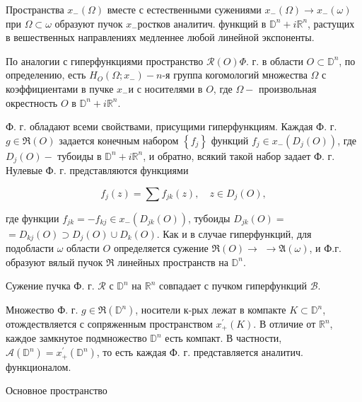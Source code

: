 \documentclass[10pt]{article}
\begin{document}
Пространства $x_{-}(\Omega)$ вместе с естественными сужениями $x_{-}(\Omega) \rightarrow x_{-}(\omega)$ при $\Omega \subset \omega$ образуют пучок $x_{-}$ростков аналитич. функщий в $\mathbb{D}^{n}+i \mathbb{R}^{n}$, растущих в вешественных направлениях медленнее любой линейной экспоненты.



По аналогии с гиперфункциями пространство $\mathscr{R}(O) \Phi$. г. в области $O \subset \mathbb{D}^{n}$, по определению, есть $H_{O}\left(\Omega ; x_{-}\right)-n$-я группа когомологий множества $\Omega$ с коэффициентами в пучке $x_{-}$и с носителями в $O$, где $\Omega-$ произвольная окрестность $O$ в $\mathbb{D}^{n}+i \mathbb{R}^{n}$.



Ф. г. обладают всеми свойствами, присущими гиперфункциям. Каждая Ф. г. $g \in \Re(O)$ задается конечным набором $\left\{f_{j}\right\}$ функций $f_{j} \in x_{-}\left(D_{j}(O)\right)$, где $D_{j}(O)-$ тубоиды в $\mathbb{D}^{n}+i \mathbb{R}^{n}$, и обратно, всякий такой набор задает Ф. г. Нулевые Ф. г. представляются функциями



\[

f_{j}(z)=\sum f_{j k}(z), \quad z \in D_{j}(O),

\]



где функции $f_{j k}=-f_{k j} \in x_{-}\left(D_{j k}(O)\right)$, тубоиды $D_{j k}(O)=$ $=D_{k j}(O) \supset D_{j}(O) \cup D_{k}(O)$. Как и в случае гиперфункций, для подобласти $\omega$ области $O$ определяется сужение $\Re(O) \rightarrow$ $\rightarrow \mathfrak{A}(\omega)$, и Ф.г. образуют вялый пучок $\Re$ линейных пространств на $\mathbb{D}^{n}$.



Сужение пучка Ф. г. $\mathscr{R}$ с $\mathbb{D}^{n}$ на $\mathbb{R}^{n}$ совпадает с пучком гиперфункций $\mathscr{B}$.



Множество Ф. г. $g \in \Re\left(\mathbb{D}^{n}\right)$, носители к-рых лежат в компакте $K \subset \mathbb{D}^{n}$, отождествляется с сопряженным пространством $x_{+}^{\prime}(K)$. В отличие от $\mathbb{R}^{n}$, каждое замкнутое подмножество $\mathbb{D}^{n}$ есть компакт. В частности, $\mathcal{A}\left(\mathbb{D}^{n}\right)=x_{+}^{\prime}\left(\mathbb{D}^{n}\right)$, то есть каждая Ф. г. представляется аналитич. функционалом.



Основное пространство
\end{document}
